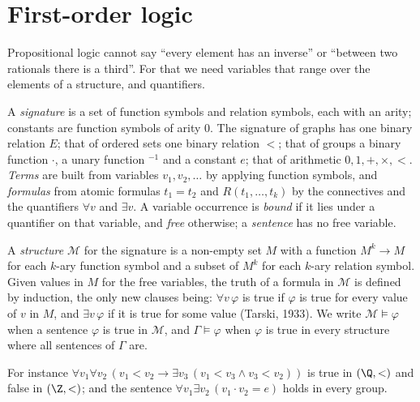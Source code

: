 \section{First-order logic}

Propositional logic cannot say ``every element has an inverse'' or ``between two rationals there is a third''. For
that we need variables that range over the elements of a structure, and quantifiers.

A \emph{signature} is a set of function symbols and relation symbols, each with an arity; constants are function symbols of
arity $0$. The signature of graphs has one binary relation $E$; that of ordered sets one binary relation $<$; that of
groups a binary function $\cdot$, a unary function ${}^{-1}$ and a constant $e$; that of arithmetic $0,1,+,\times,<$. \emph{Terms} are built from
variables $v_1,v_2,\dots$ by applying function symbols, and \emph{formulas} from atomic formulas $t_1=t_2$ and $R(t_1,\dots,t_k)$ by the
connectives and the quantifiers $\forall v$ and $\exists v$. A variable occurrence is \emph{bound} if it lies under a quantifier on that
variable, and \emph{free} otherwise; a \emph{sentence} has no free variable.

A \emph{structure} $\mathcal M$ for the signature is a non-empty set $M$ with a function $M^k\to M$ for each $k$-ary function symbol and a subset of
$M^k$ for each $k$-ary relation symbol. Given values in $M$ for the free variables, the truth of a formula in $\mathcal M$ is
defined by induction, the only new clauses being: $\forall v\,\varphi$ is true if $\varphi$ is true for every value of $v$ in $M$, and $\exists v\,\varphi$ if
it is true for some value (Tarski, 1933). We write $\mathcal M\models\varphi$ when a sentence $\varphi$ is true in $\mathcal M$, and $\Gamma\models\varphi$ when $\varphi$ is
true in every structure where all sentences of $\Gamma$ are.

For instance $\forall v_1\forall v_2\,(v_1<v_2\to\exists v_3\,(v_1<v_3\land v_3<v_2))$ is true in $(\Q,<)$ and false in $(\Z,<)$; and the sentence
$\forall v_1\exists v_2\,(v_1\cdot v_2=e)$ holds in every group.

